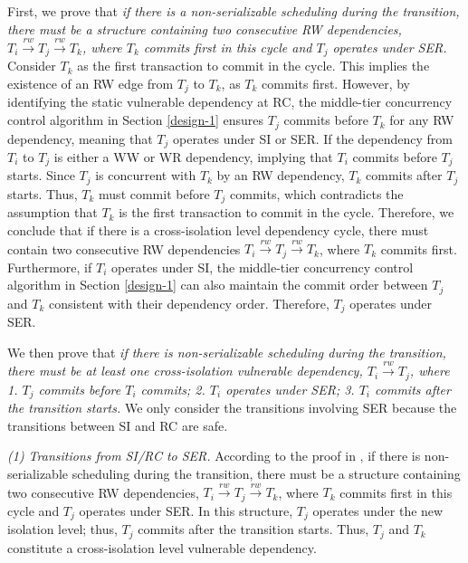 First, we prove that \textit{ if there is a non-serializable scheduling during the transition, there must be a structure containing two consecutive RW dependencies, $T_i \xrightarrow{rw} T_j \xrightarrow{rw} T_k$, where $T_k$ commits first in this cycle and $T_j$ operates under SER.} 
Consider $T_k$ as the first transaction to commit in the cycle. This implies the existence of an RW edge from $T_j$ to $T_k$, as $T_k$ commits first. However, by identifying the static vulnerable dependency at RC, the middle-tier concurrency control algorithm in Section \ref{design-1} ensures $T_j$ commits before $T_k$ for any RW dependency, meaning that $T_j$ operates under SI or SER. If the dependency from $T_i$ to $T_j$ is either a WW or WR dependency, implying that $T_i$ commits before $T_j$ starts. Since $T_j$ is concurrent with $T_k$ by an RW dependency, $T_k$ commits after $T_j$ starts. Thus, $T_k$ must commit before $T_j$ commits, which contradicts the assumption that $T_k$ is the first transaction to commit in the cycle. Therefore, we conclude that if there is a cross-isolation level dependency cycle, there must contain two consecutive RW dependencies $T_i \xrightarrow{rw} T_j \xrightarrow{rw} T_k$, where $T_k$ commits first. Furthermore, if $T_i$ operates under SI, the middle-tier concurrency control algorithm in Section \ref{design-1} can also maintain the commit order between $T_j$ and $T_k$ consistent with their dependency order. Therefore, $T_j$ operates under SER. 

We then prove that \textit{ if there is non-serializable scheduling during the transition, there must be at least one cross-isolation vulnerable dependency, $T_i \xrightarrow{rw} T_j$, where 1. $T_j$ commits before $T_i$ commits; 2. $T_i$ operates under SER; 3. $T_i$ commits after the transition starts.} We only consider the transitions involving SER because the transitions between SI and RC are safe. 

\textit{(1) Transitions from SI/RC to SER. }
According to the proof in , if there is non-serializable scheduling during the transition, there must be a structure containing two consecutive RW dependencies, $T_i \xrightarrow{rw} T_j \xrightarrow{rw} T_k$, where $T_k$ commits first in this cycle and $T_j$ operates under SER. In this structure, $T_j$ operates under the new isolation level; thus, $T_j$ commits after the transition starts. Thus, $T_j$ and $T_k$ constitute a cross-isolation level vulnerable dependency.

